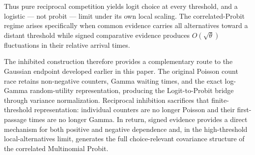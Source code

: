 \documentclass[
  man,
  floatsintext,
  longtable,
  a4paper,
  nolmodern,
  notxfonts,
  notimes,
  colorlinks=true,linkcolor=blue,citecolor=blue,urlcolor=blue]{apa7}
\begin{document}
Thus pure reciprocal competition yields logit choice at every threshold,
and a logistic --- not probit --- limit under its own local scaling. The
correlated-Probit regime arises specifically when common evidence
carries all alternatives toward a distant threshold while signed
comparative evidence produces \(O(\sqrt{\theta})\) fluctuations in their
relative arrival times.

The inhibited construction therefore provides a complementary route to
the Gaussian endpoint developed earlier in this paper. The original
Poisson count race retains non-negative counters, Gamma waiting times,
and the exact log-Gamma random-utility representation, producing the
Logit-to-Probit bridge through variance normalization. Reciprocal
inhibition sacrifices that finite-threshold representation: individual
counters are no longer Poisson and their first-passage times are no
longer Gamma. In return, signed evidence provides a direct mechanism for
both positive and negative dependence and, in the high-threshold
local-alternatives limit, generates the full choice-relevant covariance
structure of the correlated Multinomial Probit.
\end{document}
